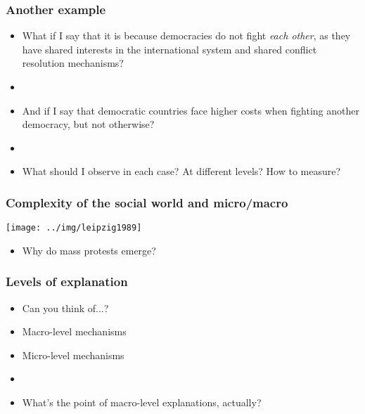 \documentclass[aspectratio=43]{beamer}
\begin{document}
\begin{frame}
\frametitle{Another example}
\centering

\begin{itemize}
  \item What if I say that it is because democracies do not fight \textit{each other}, as they have shared interests in the international system and shared conflict resolution mechanisms?
  \item[]
  \item And if I say that democratic countries face higher costs when fighting another democracy, but not otherwise?
  \item[]
  \item What should I observe in each case? At different levels? How to measure?
\end{itemize}

\end{frame}

\begin{frame}
\frametitle{Complexity of the social world and micro/macro}
\centering

\texttt{[image: ../img/leipzig1989]}

\begin{itemize}
  \item Why do mass protests emerge?
\end{itemize}

\end{frame}

\begin{frame}
\frametitle{Levels of explanation}
\centering

\begin{itemize}
\item[] Can you think of...?
\item Macro-level mechanisms
\item Micro-level mechanisms
\item[]
\item<2-> What's the point of macro-level explanations, actually?
\end{itemize}

\end{frame}
\end{document}
